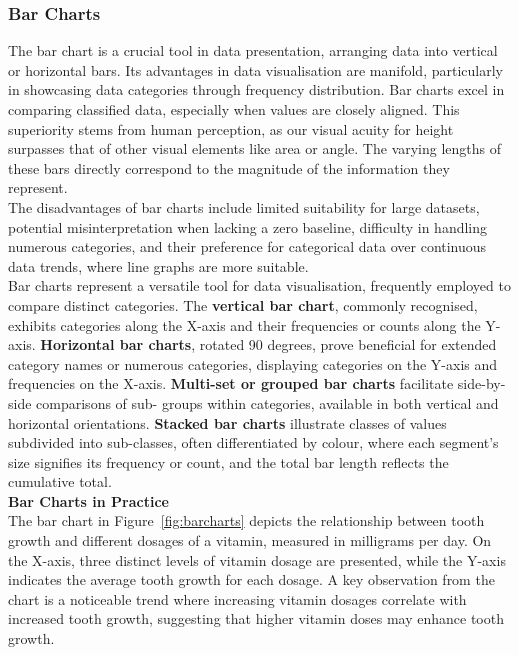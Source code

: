 \documentclass{article}\usepackage[]{graphicx}\usepackage[]{xcolor}
\begin{document}
\subsubsection{Bar Charts}
\noindent The bar chart is a crucial tool in data presentation, arranging data into vertical or horizontal bars. Its advantages in data visualisation are manifold, particularly in showcasing data categories through frequency distribution. Bar charts excel in comparing classified data, especially when values are closely aligned. This superiority stems from human perception, as our visual acuity for height surpasses that of other visual elements like area or angle. The varying lengths of these bars directly correspond to the magnitude of the information they represent.\\

\noindent The disadvantages of bar charts include limited suitability for large datasets, potential misinterpretation when lacking a zero baseline, difficulty in handling numerous categories, and their preference for categorical data over continuous data trends, where line graphs are more suitable.\\


\noindent Bar charts represent a versatile tool for data visualisation, frequently employed to compare distinct categories. The \textbf{vertical bar chart}, commonly recognised, exhibits categories along the X-axis and their frequencies or counts along the Y-axis. \textbf{Horizontal bar charts}, rotated 90 degrees, prove beneficial for extended category names or numerous categories, displaying categories on the Y-axis and frequencies on the X-axis. \textbf{Multi-set or grouped bar charts} facilitate side-by-side comparisons of sub- groups within categories, available in both vertical and horizontal orientations. \textbf{Stacked bar charts} illustrate classes of values subdivided into sub-classes, often differentiated by colour, where each segment's size signifies its frequency or count, and the total bar length reflects the cumulative total.\\

\noindent \textbf{Bar Charts in Practice}\\
\noident The bar chart in Figure~\ref{fig:barcharts} depicts the relationship between tooth growth and different dosages of a vitamin, measured in milligrams per day. On the X-axis, three distinct levels of vitamin dosage are presented, while the Y-axis indicates the average tooth growth for each dosage. A key observation from the chart is a noticeable trend where increasing vitamin dosages correlate with increased tooth growth, suggesting that higher vitamin doses may enhance tooth growth.
\end{document}
